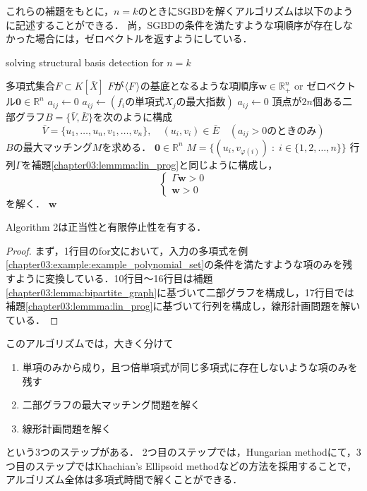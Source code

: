 これらの補題をもとに，$n=k$のときにSGBDを解くアルゴリズムは以下のように記述することができる．
尚，SGBDの条件を満たすような項順序が存在しなかった場合には，ゼロベクトルを返すようにしている．
\begin{algorithm}[htbp]
	\label{chapter03:algorithm:SGBD}
	\caption{solving structural \groebner{} basis detection for $n = k$ {\cite[Algorighm7]{sturmfels1997structural}}}
	\begin{algorithmic}[1]
		\Require 多項式集合$F \subset K[\bar{X}]$
		\Ensure $F$が$\langle F \rangle$の\groebner{}基底となるような項順序$\bm{w} \in \mathbb{R}_{+}^n$ or ゼロベクトル$\bm{0} \in \mathbb{R}^n$
				\State $a_{ij} \gets 0$
			\EndIf
			\State $a_{ij} \gets (f_i\text{の単項式}X_j\text{の最大指数})$
				\State $a_{ij} \gets 0$
			\EndIf
		\EndFor
		\State 頂点が$2n$個ある二部グラフ$B = \{\bar{V}, \bar{E}\}$を次のように構成
		$$\bar{V} = \{u_1, \dots, u_n, v_1, \dots, v_n\}, \quad (u_i, v_i) \in \bar{E} \quad(a_{ij} > 0 \text{のときのみ})$$
		\State $B$の最大マッチング$M$を求める．
			\State \Return $\bm{0} \in \mathbb{R}^n$
		\Else 
			\State $M = \{(u_i, v_{\varphi(i)})\;:\; i \in \{1, 2, \dots, n\}\}$
		\EndIf
		\State 行列$\varGamma$を補題\ref{chapter03:lemmma:lin_prog}と同じように構成し，
		$$\begin{cases}
			\varGamma \bm{w} > 0\\
			\bm{w} > 0
		\end{cases}$$
		を解く．
		\State \Return $\bm{w}$
	\end{algorithmic}
\end{algorithm}

\begin{theorem}
	Algorithm 2は正当性と有限停止性を有する．
\end{theorem}
\begin{proof}
	まず，1行目のfor文において，入力の多項式を例\ref{chapter03:example:example_polynomial_set}の条件を満たすような項のみを残すように変換している．10行目〜16行目は補題\ref{chapter03:lemma:bipartite_graph}に基づいて二部グラフを構成し，17行目では補題\ref{chapter03:lemmma:lin_prog}に基づいて行列を構成し，線形計画問題を解いている．
\end{proof}
このアルゴリズムでは，大きく分けて
\begin{enumerate}
	\item 単項のみから成り，且つ倍単項式が同じ多項式に存在しないような項のみを残す
	\item 二部グラフの最大マッチング問題を解く
	\item 線形計画問題を解く
\end{enumerate}
という$3$つのステップがある．
2つ目のステップでは，Hungarian method\cite{plummer1986matching}にて，3つ目のステップではKhachian's Ellipsoid method\cite{schrijver1998theory}などの方法を採用することで，アルゴリズム全体は多項式時間で解くことができる\cite{sturmfels1997structural}．

